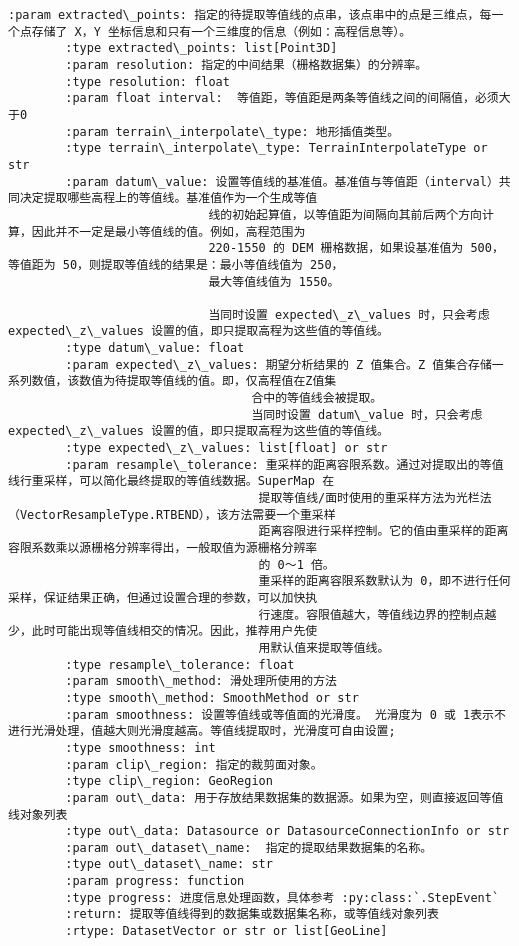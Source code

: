 \documentclass[11pt]{article}
\begin{document}
\begin{Verbatim}[commandchars=\\\{\}]
        :param extracted\_points: 指定的待提取等值线的点串，该点串中的点是三维点，每一个点存储了 X，Y 坐标信息和只有一个三维度的信息（例如：高程信息等）。
        :type extracted\_points: list[Point3D]
        :param resolution: 指定的中间结果（栅格数据集）的分辨率。
        :type resolution: float
        :param float interval:  等值距，等值距是两条等值线之间的间隔值，必须大于0
        :param terrain\_interpolate\_type: 地形插值类型。
        :type terrain\_interpolate\_type: TerrainInterpolateType or str
        :param datum\_value: 设置等值线的基准值。基准值与等值距（interval）共同决定提取哪些高程上的等值线。基准值作为一个生成等值
                            线的初始起算值，以等值距为间隔向其前后两个方向计算，因此并不一定是最小等值线的值。例如，高程范围为
                            220-1550 的 DEM 栅格数据，如果设基准值为 500，等值距为 50，则提取等值线的结果是：最小等值线值为 250，
                            最大等值线值为 1550。
        
                            当同时设置 expected\_z\_values 时，只会考虑 expected\_z\_values 设置的值，即只提取高程为这些值的等值线。
        :type datum\_value: float
        :param expected\_z\_values: 期望分析结果的 Z 值集合。Z 值集合存储一系列数值，该数值为待提取等值线的值。即，仅高程值在Z值集
                                  合中的等值线会被提取。
                                  当同时设置 datum\_value 时，只会考虑 expected\_z\_values 设置的值，即只提取高程为这些值的等值线。
        :type expected\_z\_values: list[float] or str
        :param resample\_tolerance: 重采样的距离容限系数。通过对提取出的等值线行重采样，可以简化最终提取的等值线数据。SuperMap 在
                                   提取等值线/面时使用的重采样方法为光栏法（VectorResampleType.RTBEND），该方法需要一个重采样
                                   距离容限进行采样控制。它的值由重采样的距离容限系数乘以源栅格分辨率得出，一般取值为源栅格分辨率
                                   的 0～1 倍。
                                   重采样的距离容限系数默认为 0，即不进行任何采样，保证结果正确，但通过设置合理的参数，可以加快执
                                   行速度。容限值越大，等值线边界的控制点越少，此时可能出现等值线相交的情况。因此，推荐用户先使
                                   用默认值来提取等值线。
        :type resample\_tolerance: float
        :param smooth\_method: 滑处理所使用的方法
        :type smooth\_method: SmoothMethod or str
        :param smoothness: 设置等值线或等值面的光滑度。 光滑度为 0 或 1表示不进行光滑处理，值越大则光滑度越高。等值线提取时，光滑度可自由设置;
        :type smoothness: int
        :param clip\_region: 指定的裁剪面对象。
        :type clip\_region: GeoRegion
        :param out\_data: 用于存放结果数据集的数据源。如果为空，则直接返回等值线对象列表
        :type out\_data: Datasource or DatasourceConnectionInfo or str
        :param out\_dataset\_name:  指定的提取结果数据集的名称。
        :type out\_dataset\_name: str
        :param progress: function
        :type progress: 进度信息处理函数，具体参考 :py:class:`.StepEvent`
        :return: 提取等值线得到的数据集或数据集名称，或等值线对象列表
        :rtype: DatasetVector or str or list[GeoLine]
    

\end{Verbatim}
\end{document}

